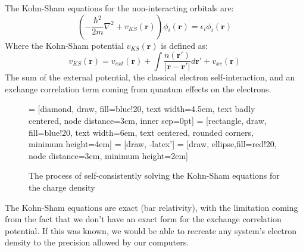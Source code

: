 \documentclass[12pt]{article}
\begin{document}
The Kohn-Sham equations for the non-interacting orbitals are:
\begin{equation}\label{eq:kohn-sham}
\left(-\frac{\hbar^2}{2m}\nabla^2 + v_{KS}(\mathbf r)\right)\phi_i(\mathbf r) = \epsilon_i \phi_i(\mathbf r)
\end{equation}
Where the Kohn-Sham potential $v_{KS}(\mathbf r)$ is defined as:
\begin{equation}\label{eq:kohn-shampotential}
v_{KS}(\mathbf r) = v_{ext}(\mathbf r) + \int \frac{n(\mathbf r')}{\left|\mathbf r - \mathbf {r'}\right|}d\mathbf {r'} + v_{xc}(\mathbf r)
\end{equation}
The sum of the external potential, the classical electron self-interaction, and an exchange correlation term coming from quantum effects on the electrons. 
\begin{figure}
\centering
	 = [diamond, draw, fill=blue!20, 
    text width=4.5em, text badly centered, node distance=3cm, inner sep=0pt]
 = [rectangle, draw, fill=blue!20, 
    text width=6em, text centered, rounded corners, minimum height=4em]
 = [draw, -latex']
 = [draw, ellipse,fill=red!20, node distance=3cm,
    minimum height=2em]
    
\caption{The process of self-consistently solving the Kohn-Sham equations for the charge density}
\end{figure}

The Kohn-Sham equations are exact (bar relativity), with the limitation coming from the fact that we don't have an exact form for the exchange correlation potential. 
If this was known, we would be able to recreate any system's electron density to the precision allowed by our computers.
\end{document}
